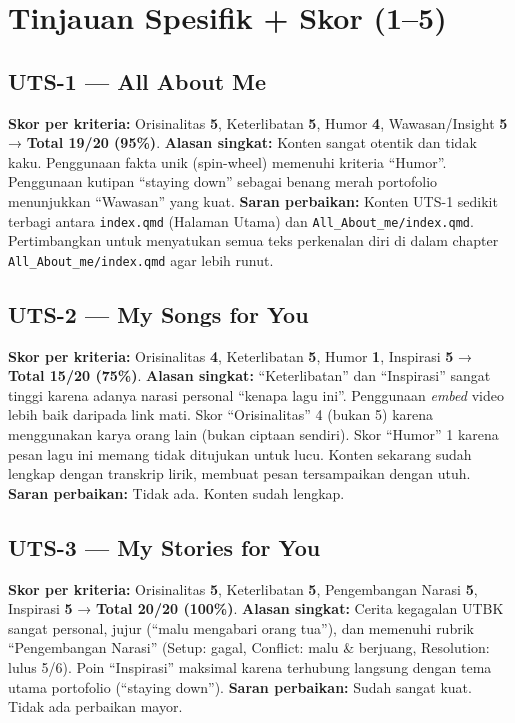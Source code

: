 \documentclass[
  letterpaper,
  DIV=11,
  numbers=noendperiod]{scrreprt}
\begin{document}
\section{Tinjauan Spesifik + Skor
(1--5)}\label{tinjauan-spesifik-skor-15}

\subsection{UTS-1 --- All About Me}\label{uts-1-all-about-me-1}

\textbf{Skor per kriteria:} Orisinalitas \textbf{5}, Keterlibatan
\textbf{5}, Humor \textbf{4}, Wawasan/Insight \textbf{5} → \textbf{Total
19/20 (95\%)}. \textbf{Alasan singkat:} Konten sangat otentik dan tidak
kaku. Penggunaan fakta unik (spin-wheel) memenuhi kriteria ``Humor''.
Penggunaan kutipan ``staying down'' sebagai benang merah portofolio
menunjukkan ``Wawasan'' yang kuat. \textbf{Saran perbaikan:} Konten
UTS-1 sedikit terbagi antara \texttt{index.qmd} (Halaman Utama) dan
\texttt{All\_About\_me/index.qmd}. Pertimbangkan untuk menyatukan semua
teks perkenalan diri di dalam chapter \texttt{All\_About\_me/index.qmd}
agar lebih runut.

\subsection{UTS-2 --- My Songs for You}\label{uts-2-my-songs-for-you}

\textbf{Skor per kriteria:} Orisinalitas \textbf{4}, Keterlibatan
\textbf{5}, Humor \textbf{1}, Inspirasi \textbf{5} → \textbf{Total 15/20
(75\%)}. \textbf{Alasan singkat:} ``Keterlibatan'' dan ``Inspirasi''
sangat tinggi karena adanya narasi personal ``kenapa lagu ini''.
Penggunaan \emph{embed} video lebih baik daripada link mati. Skor
``Orisinalitas'' 4 (bukan 5) karena menggunakan karya orang lain (bukan
ciptaan sendiri). Skor ``Humor'' 1 karena pesan lagu ini memang tidak
ditujukan untuk lucu. Konten sekarang sudah lengkap dengan transkrip
lirik, membuat pesan tersampaikan dengan utuh. \textbf{Saran perbaikan:}
Tidak ada. Konten sudah lengkap.

\subsection{UTS-3 --- My Stories for
You}\label{uts-3-my-stories-for-you}

\textbf{Skor per kriteria:} Orisinalitas \textbf{5}, Keterlibatan
\textbf{5}, Pengembangan Narasi \textbf{5}, Inspirasi \textbf{5} →
\textbf{Total 20/20 (100\%)}. \textbf{Alasan singkat:} Cerita kegagalan
UTBK sangat personal, jujur (``malu mengabari orang tua''), dan memenuhi
rubrik ``Pengembangan Narasi'' (Setup: gagal, Conflict: malu \&
berjuang, Resolution: lulus 5/6). Poin ``Inspirasi'' maksimal karena
terhubung langsung dengan tema utama portofolio (``staying down'').
\textbf{Saran perbaikan:} Sudah sangat kuat. Tidak ada perbaikan mayor.
\end{document}

